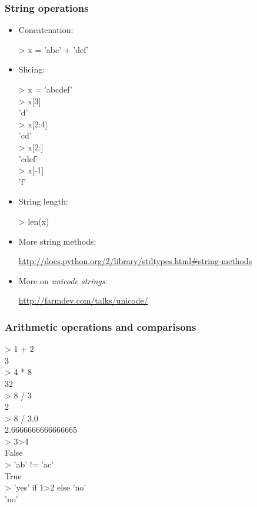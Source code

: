 \documentclass{beamer}
\newenvironment{code}{%
  \begin{exampleblock}{}
      \ttfamily
    }{%
  \end{exampleblock}
}
\begin{document}
\begin{frame}[allowframebreaks]
    \frametitle{String operations}
    \begin{itemize}
    \item Concatenation:
        \begin{code}
            > x = 'abc' + 'def'
        \end{code}
    \item Slicing:
        \begin{code}
            > x = 'abcdef'\\
            > x[3]\\
            'd'\\
            > x[2:4]\\
            'cd'\\
            > x[2:]\\
            'cdef'\\
            > x[-1]\\
            'f'
        \end{code}
    \item String length:
        \begin{code}
            > len(x)
        \end{code}
    \item More string methods:
        \begin{block}{}
            \url{http://docs.python.org/2/library/stdtypes.html\#string-methods}
        \end{block}
    \item More on \emph{unicode strings}:
        \begin{block}{}
            \url{http://farmdev.com/talks/unicode/}
        \end{block}
    \end{itemize}
\end{frame}

\begin{frame}
    \frametitle{Arithmetic operations and comparisons}
    \begin{code}
        > 1 + 2\\
        3\\
        > 4 * 8\\
        32\\
        > 8 / 3\\
        2\\
        > 8 / 3.0\\
        2.6666666666666665\\
        > 3>4\\
        False\\
        > 'ab' != 'ac'\\
        True\\
        > 'yes' if 1>2 else 'no'\\
        'no'
    \end{code}
\end{frame}
\end{document}
